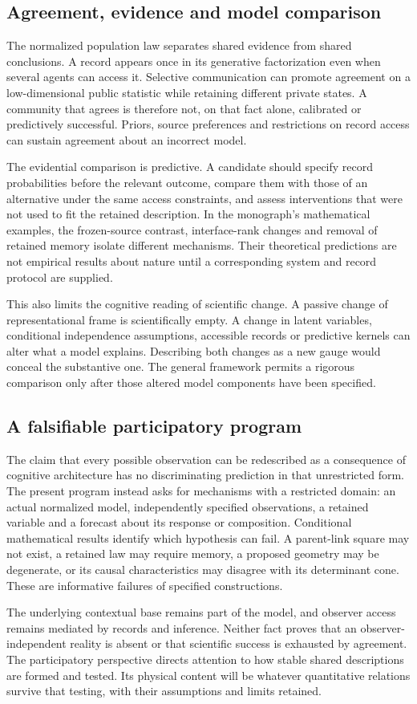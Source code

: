 \subsection{Agreement, evidence and model comparison}

The normalized population law separates shared evidence from shared conclusions. A record appears once in its generative factorization even when several agents can access it. Selective communication can promote agreement on a low-dimensional public statistic while retaining different private states. A community that agrees is therefore not, on that fact alone, calibrated or predictively successful. Priors, source preferences and restrictions on record access can sustain agreement about an incorrect model.

The evidential comparison is predictive. A candidate should specify record probabilities before the relevant outcome, compare them with those of an alternative under the same access constraints, and assess interventions that were not used to fit the retained description. In the monograph's mathematical examples, the frozen-source contrast, interface-rank changes and removal of retained memory isolate different mechanisms. Their theoretical predictions are not empirical results about nature until a corresponding system and record protocol are supplied.

This also limits the cognitive reading of scientific change. A passive change of representational frame is scientifically empty. A change in latent variables, conditional independence assumptions, accessible records or predictive kernels can alter what a model explains. Describing both changes as a new gauge would conceal the substantive one. The general framework permits a rigorous comparison only after those altered model components have been specified.

\subsection{A falsifiable participatory program}

The claim that every possible observation can be redescribed as a consequence of cognitive architecture has no discriminating prediction in that unrestricted form. The present program instead asks for mechanisms with a restricted domain: an actual normalized model, independently specified observations, a retained variable and a forecast about its response or composition. Conditional mathematical results identify which hypothesis can fail. A parent-link square may not exist, a retained law may require memory, a proposed geometry may be degenerate, or its causal characteristics may disagree with its determinant cone. These are informative failures of specified constructions.

The underlying contextual base remains part of the model, and observer access remains mediated by records and inference. Neither fact proves that an observer-independent reality is absent or that scientific success is exhausted by agreement. The participatory perspective directs attention to how stable shared descriptions are formed and tested. Its physical content will be whatever quantitative relations survive that testing, with their assumptions and limits retained.

